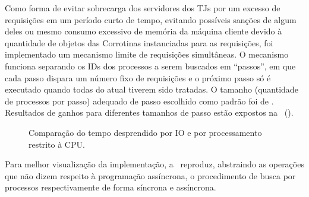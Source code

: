 Como forma de evitar sobrecarga dos servidores dos TJs por um excesso de
requisições em um período curto de tempo, evitando possíveis sanções de algum
deles ou mesmo consumo excessivo de memória da máquina cliente devido à
quantidade de objetos das Corrotinas instanciadas para as requisições, foi
implementado um mecanismo limite de requisições simultâneas. O mecanismo
funciona separando os IDs dos processos a serem buscados em ``passos'', em que
cada passo dispara um número fixo de requisições e o próximo passo só é
executado quando todas do atual tiverem sido tratadas. O tamanho (quantidade de
processos por passo) adequado de passo escolhido como padrão foi de
. Resultados de ganhos para diferentes tamanhos de passo estão
expostos na~
().

\begin{figure}[htb]
    \caption{Comparação do tempo desprendido por IO e por processamento restrito à CPU.}
    \label{gra:tempo-io-vs-proc}
\end{figure}

Para melhor visualização da implementação,
a~ reproduz, abstraindo as
operações que não dizem respeito à programação assíncrona, o procedimento de
busca por processos respectivamente de forma síncrona e assíncrona.

